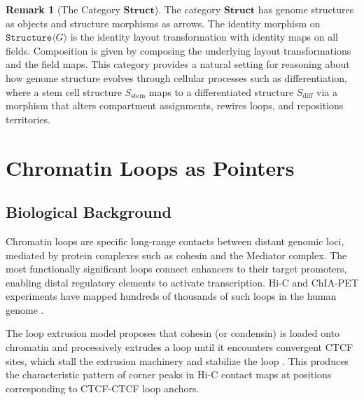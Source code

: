 \documentclass[12pt,a4paper]{article}
\theoremstyle{plain}
\theoremstyle{definition}
\newtheorem{remark}[theorem]{Remark}
\begin{document}
\begin{center}
\end{center}

\begin{remark}[The Category $\mathbf{Struct}$]
The category $\mathbf{Struct}$ has genome structures as objects and structure morphisms as arrows. The identity morphism on $\texttt{Structure}\langle G \rangle$ is the identity layout transformation with identity maps on all fields. Composition is given by composing the underlying layout transformations and the field maps. This category provides a natural setting for reasoning about how genome structure evolves through cellular processes such as differentiation, where a stem cell structure $S_{\text{stem}}$ maps to a differentiated structure $S_{\text{diff}}$ via a morphism that alters compartment assignments, rewires loops, and repositions territories.
\end{remark}


\section{Chromatin Loops as Pointers}\label{sec:loops}

\subsection{Biological Background}

Chromatin loops are specific long-range contacts between distant genomic loci, mediated by protein complexes such as cohesin and the Mediator complex. The most functionally significant loops connect enhancers to their target promoters, enabling distal regulatory elements to activate transcription. Hi-C and ChIA-PET experiments have mapped hundreds of thousands of such loops in the human genome \cite{rao20143d, fullwood2009oestrogen}.

The loop extrusion model proposes that cohesin (or condensin) is loaded onto chromatin and processively extrudes a loop until it encounters convergent CTCF sites, which stall the extrusion machinery and stabilize the loop \cite{fudenberg2016formation, sanborn2015chromatin}. This produces the characteristic pattern of corner peaks in Hi-C contact maps at positions corresponding to CTCF-CTCF loop anchors.
\end{document}
